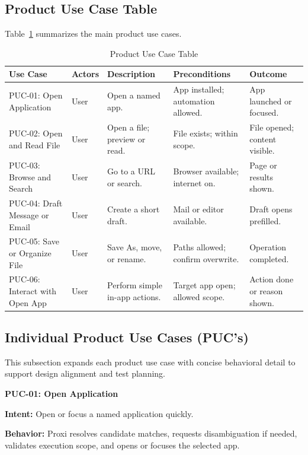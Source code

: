 \documentclass[12pt]{article}
\begin{document}
\subsection{Product Use Case Table}
Table~\ref{tab:puc-table} summarizes the main product use cases.

\begin{table}[H]
\centering
\caption{Product Use Case Table}
\label{tab:puc-table}
\begin{tabular}{|p{2.7cm}|p{2.1cm}|p{3.2cm}|p{3.2cm}|p{2.6cm}|}
\hline
\textbf{Use Case} &
\textbf{Actors} &
\textbf{Description} &
\textbf{Preconditions} &
\textbf{Outcome} \\
\hline
PUC-01: Open Application &
User &
Open a named app. &
App installed; automation allowed. &
App launched or focused. \\
\hline
PUC-02: Open and Read File &
User &
Open a file; preview or read. &
File exists; within scope. &
File opened; content visible. \\
\hline
PUC-03: Browse and Search &
User &
Go to a URL or search. &
Browser available; internet on. &
Page or results shown. \\
\hline
PUC-04: Draft Message or Email &
User &
Create a short draft. &
Mail or editor available. &
Draft opens prefilled. \\
\hline
PUC-05: Save or Organize File &
User &
Save As, move, or rename. &
Paths allowed; confirm overwrite. &
Operation completed. \\
\hline
PUC-06: Interact with Open App &
User &
Perform simple in-app actions. &
Target app open; allowed scope. &
Action done or reason shown. \\
\hline
\end{tabular}
\end{table}

\subsection{Individual Product Use Cases (PUC's)}
This subsection expands each product use case with concise behavioral
detail to support design alignment and test planning.

\medskip
\noindent\textbf{PUC-01: Open Application}

\textbf{Intent:} Open or focus a named application quickly.

\textbf{Behavior:} Proxi resolves candidate matches, requests
disambiguation if needed, validates execution scope, and opens or
focuses the selected app.
\end{document}
